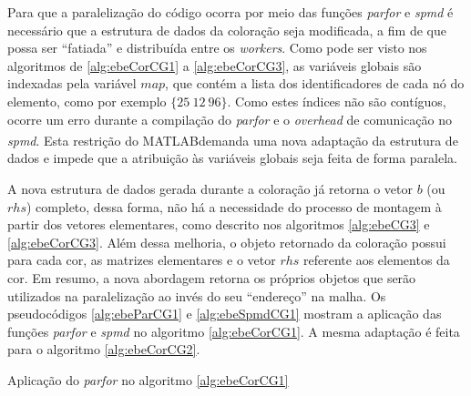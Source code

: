 \documentclass[
    12pt,               %
    openright,          %
    oneside,
    a4paper,            %
    english,            %
    french,             %
    spanish,            %
    brazil              %
    ]{abntex2}
\newcommand{\matlab}{MATLAB\textsuperscript{\textregistered}}
\begin{document}
Para que a paralelização do código ocorra por meio das funções \textit{parfor} e \textit{spmd} é necessário que a estrutura de dados da coloração seja modificada, a fim de que possa ser ``fatiada'' e distribuída entre os \textit{workers}. Como pode ser visto nos algoritmos de \ref{alg:ebeCorCG1} a \ref{alg:ebeCorCG3}, as variáveis globais são indexadas pela variável $map$, que contém a lista dos identificadores de cada nó do elemento, como por exemplo $\{25 \ 12 \ 96\}$. Como estes índices não são contíguos, ocorre um erro durante a compilação do \textit{parfor} e o \textit{overhead} de comunicação no \textit{spmd}. Esta restrição do \matlab demanda uma nova adaptação da estrutura de dados e impede que a atribuição às variáveis globais seja feita de forma paralela.

A nova estrutura de dados gerada durante a coloração já retorna o vetor $b$ (ou $rhs$) completo, dessa forma, não há a necessidade do processo de montagem à partir dos vetores elementares, como descrito nos algoritmos \ref{alg:ebeCG3} e \ref{alg:ebeCorCG3}. Além dessa melhoria, o objeto retornado da coloração possui para cada cor, as matrizes elementares e o vetor $rhs$ referente aos elementos da cor. Em resumo, a nova abordagem retorna os próprios objetos que serão utilizados na paralelização ao invés do seu ``endereço'' na malha. Os pseudocódigos \ref{alg:ebeParCG1} e \ref{alg:ebeSpmdCG1} mostram a aplicação das funções \textit{parfor} e \textit{spmd} no algoritmo \ref{alg:ebeCorCG1}. A mesma adaptação é feita para o algoritmo \ref{alg:ebeCorCG2}.



\begin{algorithm}	
	\caption{\label{alg:ebeParCG1}Aplicação do \textit{parfor} no algoritmo \ref{alg:ebeCorCG1}} 
	\begin{algorithmic}[1]
		\EndFor
		\EndFor
	\end{algorithmic}
\end{algorithm}
\end{document}
